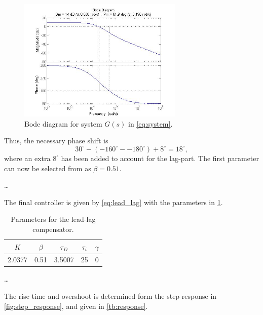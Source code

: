\documentclass[a4paper]{article}
\begin{document}
\begin{figure}[h!]
	\begin{center}
		\includegraphics[width=0.7\textwidth]{G_margin}
	\end{center}
	\caption{Bode diagram for system $G(s)$ in \eqref{eq:system}.}
	\label{fig:bode_diagram}
\end{figure}

Thus, the necessary phase shift is
\[
	30^\circ - (-160^\circ - -180^\circ) + 8^\circ = 18^\circ,
\]
where an extra $8^\circ$ has been added to account for the lag-part. The first parameter can now be selected from \cite[fig. 5.13]{basic_book} as $\beta = 0.51$.

\ldots

The final controller is given by \cref{eq:lead_lag} with the parameters in \cref{tb:lead_lag_parameters}.
\begin{table}
\begin{center}
	\begin{tabular}{|c|c|c|c|c|}
		\hline
		$K$ & $\beta$ & $\tau_D$ & $\tau_i$ & $\gamma$\\
		\hline
		2.0377 & 0.51 & 3.5007 & 25 & 0\\
		\hline
	\end{tabular}
\end{center}
\caption{Parameters for the lead-lag compensator.}
\label{tb:lead_lag_parameters}
\end{table}

\ldots

The rise time and overshoot is determined form the step response in \cref{fig:step_response}, and given in \cref{tb:response}.
\end{document}
